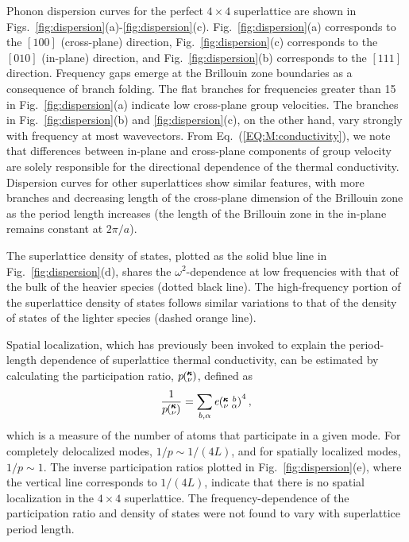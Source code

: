 \documentclass[aps,prb,preprint,preprintnumbers,amsmath,amssymb,floatfix,superscriptaddress]{revtex4}
\newcommand{\kvba}{\mspace{-4.0mu}\left(\mspace{-8.0mu}
\begin{smallmatrix} &\pmb{\kappa} &b \\ &\nu &\alpha\end{smallmatrix}
\mspace{-3.0mu}\right)}
\newcommand{\kv}{\mspace{-4.0mu}\left(\mspace{-8.0mu}
\begin{smallmatrix}&\pmb{\kappa} \\&\nu\end{smallmatrix}
\mspace{-3.0mu}\right)}
\begin{document}
Phonon dispersion curves for the perfect $4\times4$ superlattice are shown in Figs.~\ref{fig:dispersion}(a)-\ref{fig:dispersion}(c). Fig.~\ref{fig:dispersion}(a) corresponds to the $[1 0 0]$ (cross-plane) direction, Fig.~\ref{fig:dispersion}(c) corresponds to the $[0 1 0]$ (in-plane) direction, and Fig.~\ref{fig:dispersion}(b) corresponds to the $[1 1 1]$ direction. Frequency gaps emerge at the Brillouin zone boundaries as a consequence of branch folding.\cite{PhysRevB.38.1427,PhysRevB.60.2627} The flat branches for frequencies greater than 15 in Fig.~\ref{fig:dispersion}(a) indicate low cross-plane group velocities. The branches in Fig.~\ref{fig:dispersion}(b) and \ref{fig:dispersion}(c), on the other hand, vary strongly with frequency at most wavevectors. From Eq.~(\ref{EQ:M:conductivity}), we note that differences between in-plane and cross-plane components of group velocity are solely responsible for the directional dependence of the thermal conductivity.  Dispersion curves for other superlattices show similar features, with more branches and decreasing length of the cross-plane dimension of the Brillouin zone as the period length increases (the length of the Brillouin zone in the in-plane remains constant at $2\pi/a$).
\renewcommand{\topfraction}{0.7}
\begin{figure*}%
\begin{center}
\renewcommand{\figure}{Fig.}
\caption{(a),(b),(c) Dispersion, (d) density of states and (e) inverse participation ratio for a $4\times4$ superlattice. Labeled gray squares represent select modes for Fig.~\ref{fig:sed}.}
\label{fig:dispersion}
\end{center}
\end{figure*}
The superlattice density of states, plotted as the solid blue line in Fig.~\ref{fig:dispersion}(d), shares the $\omega^2$-dependence at low frequencies with that of the bulk of the heavier species (dotted black line). The high-frequency portion of the superlattice density of states follows similar variations to that of the density of states of the lighter species (dashed orange line). 

Spatial localization, which has previously been invoked to explain the period-length dependence of superlattice thermal conductivity, \cite{PhysRevB.61.3091} can be estimated by calculating the participation ratio, $p\kv$, defined as\cite{PhysRevB.70.235214}
\begin{equation}\label{EQ:P_ratio}
\begin{split}
\frac{1}{p\kv}=\sum_{b,\alpha}e\kvba^4,
\end{split}
\end{equation}
which is a measure of the number of atoms that participate in a given mode. For completely delocalized modes, $1/p\sim 1/(4L)$, and for spatially localized modes, $1/p\sim 1$.\cite{PhysRevB.70.235214} The inverse participation ratios plotted in Fig.~\ref{fig:dispersion}(e), where the vertical line corresponds to $1/(4L)$, indicate that there is no spatial localization in the $4\times4$ superlattice. The frequency-dependence of the participation ratio and density of states were not found to vary with superlattice period length.
\end{document}
